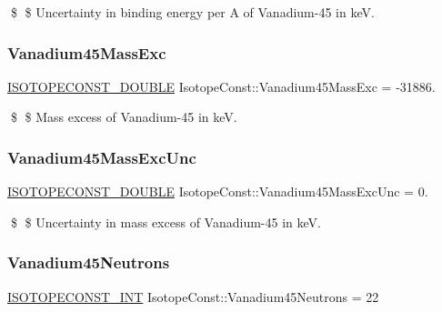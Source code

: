 \$ \$ Uncertainty in binding energy per A of Vanadium-\/45 in keV. \mbox{\label{group___isotope_const-_vanadium-_v45_ga302fb9d4fddfcd25868f773c4bb211f1}} 
\subsubsection{\texorpdfstring{Vanadium45\+Mass\+Exc}{Vanadium45MassExc}}
{\footnotesize\ttfamily \mbox{\hyperlink{group___isotope_const-_macros_ga8f45a7272ce02c0b4c65c44636ed719a}{I\+S\+O\+T\+O\+P\+E\+C\+O\+N\+S\+T\+\_\+\+D\+O\+U\+B\+LE}} Isotope\+Const\+::\+Vanadium45\+Mass\+Exc = -\/31886.}

\$ \$ Mass excess of Vanadium-\/45 in keV. \mbox{\label{group___isotope_const-_vanadium-_v45_ga92ceabf996871c348b1170126836fa8b}} 
\subsubsection{\texorpdfstring{Vanadium45\+Mass\+Exc\+Unc}{Vanadium45MassExcUnc}}
{\footnotesize\ttfamily \mbox{\hyperlink{group___isotope_const-_macros_ga8f45a7272ce02c0b4c65c44636ed719a}{I\+S\+O\+T\+O\+P\+E\+C\+O\+N\+S\+T\+\_\+\+D\+O\+U\+B\+LE}} Isotope\+Const\+::\+Vanadium45\+Mass\+Exc\+Unc = 0.}

\$ \$ Uncertainty in mass excess of Vanadium-\/45 in keV. \mbox{\label{group___isotope_const-_vanadium-_v45_ga49907c467ff670772692b827e892794e}} 
\subsubsection{\texorpdfstring{Vanadium45\+Neutrons}{Vanadium45Neutrons}}
{\footnotesize\ttfamily \mbox{\hyperlink{group___isotope_const-_macros_ga5f18360b3e99483a35c32d789e62621c}{I\+S\+O\+T\+O\+P\+E\+C\+O\+N\+S\+T\+\_\+\+I\+NT}} Isotope\+Const\+::\+Vanadium45\+Neutrons = 22}

